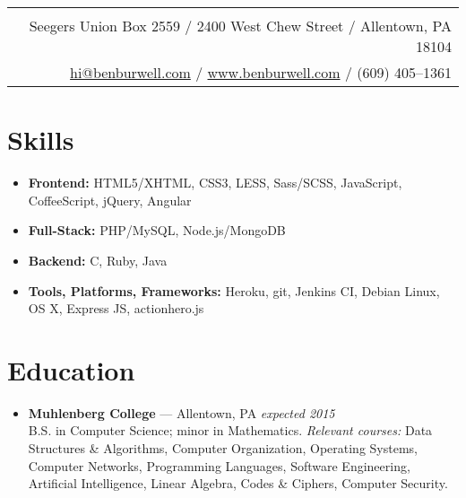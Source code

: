 \documentclass[11pt]{article}
\begin{document}
\thispagestyle{empty}

\noindent\begin{tabularx}{\textwidth}{|N|}
   \\
  Seegers Union Box 2559 / 2400 West Chew Street / Allentown, PA 18104 \\
  \href{mailto:hi@benburwell.com}{hi@benburwell.com} / \href{https://www.benburwell.com/}{www.benburwell.com} / (609) 405--1361 \\
  \hline
\end{tabularx}



\section*{Skills}
\begin{itemize}
  \item \textbf{Frontend:} HTML5/XHTML, CSS3, LESS, Sass/SCSS, JavaScript, CoffeeScript, jQuery, Angular
  \item \textbf{Full-Stack:} PHP/MySQL, Node.js/MongoDB
  \item \textbf{Backend:} C, Ruby, Java
  \item \textbf{Tools, Platforms, Frameworks:} Heroku, git, Jenkins CI, Debian Linux, OS X, Express JS, actionhero.js
\end{itemize}



\section*{Education}
\begin{itemize}
  \item \textbf{Muhlenberg College} --- Allentown, PA \hfill {\em expected 2015} \\
    B.S. in Computer Science; minor in Mathematics. {\em Relevant courses:} Data Structures \& Algorithms, Computer Organization, Operating Systems, Computer Networks, Programming Languages, Software Engineering, Artificial Intelligence, Linear Algebra, Codes \& Ciphers, Computer Security.
\end{itemize}
\end{document}
